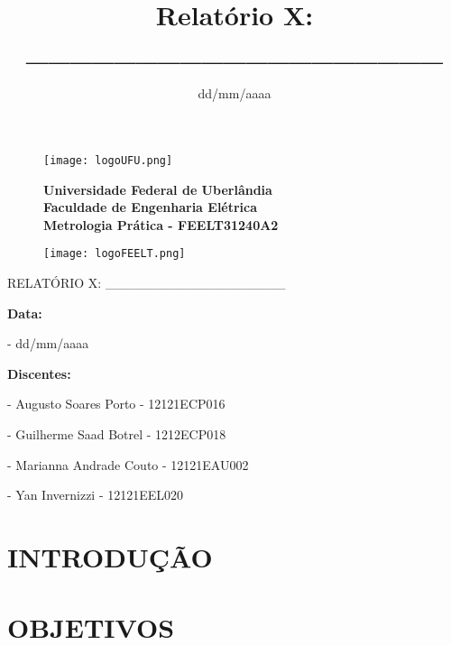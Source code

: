 \documentclass[a4paper, 12pt]{article}
\title{Relatório X: ___________________}
\date{dd/mm/aaaa}
\begin{document}
\thispagestyle{empty}

\begin{figure}[ht]
    \begin{minipage}{0.21\linewidth}
    \flushleft
    \texttt{[image: logoUFU.png]}
    \end{minipage}
    \begin{minipage}{0.55\linewidth}
    \centering
    \Large \textbf{Universidade Federal de Uberlândia\\
    \Large Faculdade de Engenharia Elétrica\\
    \Large Metrologia Prática  - FEELT31240A2}
    
    \end{minipage}
    \begin{minipage}{0.21\linewidth}
    \flushright
    \texttt{[image: logoFEELT.png]}
    \end{minipage}  
\end{figure}

\vspace{60mm}

\begin{Huge}
\begin{center}
    RELATÓRIO X: ___________________
\end{center}
\end{Huge}

\vspace{60mm}

\textbf{Data:} 
\vspace{2mm}

\quad- dd/mm/aaaa
\vspace{4mm}

\textbf{Discentes:}
\vspace{2mm}

\quad- Augusto Soares Porto - 12121ECP016

\quad- Guilherme Saad Botrel - 1212ECP018 

\quad- Marianna Andrade Couto - 12121EAU002

\quad- Yan Invernizzi - 12121EEL020


\section*{INTRODUÇÃO}
\setcounter{page}{0}


\section{OBJETIVOS}
\end{document}
